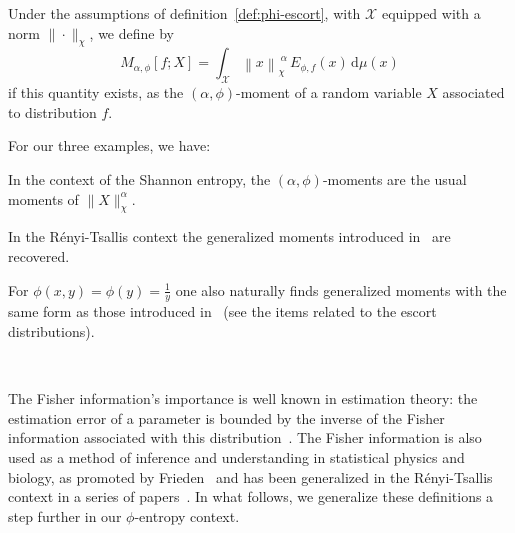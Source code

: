 \documentclass[entropy,article,submit,moreauthors,pdftex]{Definitions/mdpi}
\newcounter{GaussExample}%
\newcounter{qGaussExample}%
\newcounter{arcsineExample}%
\newcommand{\SZ}[1]{{\color{blue} #1}}                                       %
\def\dmu{\mathrm{d}\mu}%
\def\X{\mathcal{X}}%
\begin{document}
\begin{Definition}
\label{def:phi-moment}
%
  Under the  assumptions of  definition~\ref{def:phi-escort}, with  $\X$ equipped
  with a norm $\| \cdot \|_\chi$, we define by
  \begin{equation}\label{eq:phi-moment}
  M_{\alpha,\phi}[f;X] = \int_\X \left\| x \right\|_\chi^{\: \alpha} \,
  E_{\phi,f}(x) \, \dmu(x)
  \end{equation}
  if  this  quantity  exists,  as the  $(\alpha,\phi)$-moment  of  \SZ{a  random
    variable $X$} associated to distribution $f$.
\end{Definition}
%
For our three examples, we have:
%
\begin{Example}
  In the  context of  the Shannon entropy,  the $(\alpha,\phi)$-moments  are the
  usual moments of $\|X\|_\chi^\alpha$.
\end{Example}
%
\begin{Example}
  In   the   R\'enyi-Tsallis   context   the   generalized   moments   introduced
  in~\cite{TsaMen98, MarNic00} are recovered.
\end{Example}
%
\begin{Example}
  For  $\phi(x,y)  =  \phi(y)  =   \frac{1}{y}$  one  also  naturally  \SZ{finds
    generalized   moments   with   the    same   form   as   those}   introduced
  in~\cite{TsaMen98,   MarNic00}  (see   the   items  related   to  the   escort
  distributions).
\end{Example}

\

The  Fisher information's  importance is  well known  in estimation  theory: the
estimation  error  of a  parameter  is  bounded by  the  inverse  of the  Fisher
information associated with this distribution~\cite{Kay93, CovTho06}. The Fisher
information  is  also  used  as  a method  of  inference  and  understanding  in
statistical physics  and biology,  as promoted  by Frieden~\cite{Fri04}  and has
been   generalized   in   the   R\'enyi-Tsallis   context   in   a   series   of
papers~\cite{Ham78,   ChiPen00,   CasChi02,  LutYan05,   LutLv12,   Ber12:06_1,
  Ber12:06_2, Ber13}.  In  what follows, we generalize these  definitions a step
further in our $\phi$-entropy context.
\end{document}
